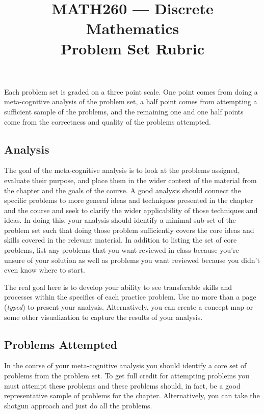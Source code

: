 \documentclass[nobib]{tufte-handout}
\title{MATH260 --- Discrete Mathematics \\  Problem Set Rubric}
\begin{document}
\maketitle

Each problem set is graded on a three point scale.  One point comes from doing a meta-cognitive analysis of the problem set, a half point comes from attempting a sufficient sample of the problems, and the remaining one and one half points come from the correctness and quality of the problems attempted.

\subsection*{Analysis}

The goal of the meta-cognitive analysis is to look at the problems assigned, evaluate their purpose, and place them in the wider context of the material from the chapter and the goals of the course. A good analysis should connect the specific problems to more general ideas and techniques presented in the chapter and the course and seek to clarify the wider applicability of those techniques and ideas. In doing this, your analysis should identify a minimal sub-set of the problem set such that doing those problem sufficiently covers the core ideas and skills covered in the relevant material.  In addition to listing the set of core problems, list any problems that you want reviewed in class because you're unsure of your solution as well as problems you want reviewed because you didn't even know where to start.


The real goal here is to develop your ability to see transferable skills and processes within the specifics of each practice problem. Use no more than a page (\textit{typed}) to present your analysis. Alternatively, you can create a concept map or some other visualization to capture the results of your analysis.

\subsection*{Problems Attempted}

In the course of your meta-cognitive analysis you should identify a core set of problems from the problem set.  To get full credit for attempting problems you must attempt these problems and these problems should, in fact, be a good representative sample of problems for the chapter. Alternatively, you can take the shotgun approach and just do all the problems.
\end{document}

